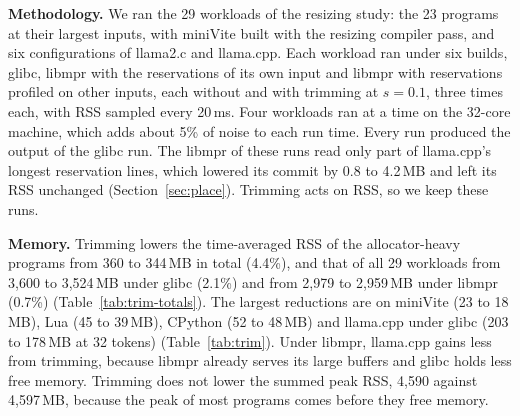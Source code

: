 \documentclass[11pt]{article}
\newcommand{\secref}[1]{Section~\ref{#1}}
\newcommand{\tabref}[1]{Table~\ref{#1}}
\begin{document}
\textbf{Methodology.} We ran the 29 workloads of the resizing study: the 23 programs at their largest inputs, with
miniVite built with the resizing compiler pass, and six configurations of llama2.c and llama.cpp. Each workload ran
under six builds, glibc, libmpr with the reservations of its own input and libmpr with reservations profiled on
other inputs, each without and with trimming at $s = 0.1$, three times each, with RSS sampled every 20\,ms. Four
workloads ran at a time on the 32-core machine, which adds about 5\% of noise to each run time. Every run produced
the output of the glibc run. The libmpr of these runs read only part of llama.cpp's longest reservation lines, which
lowered its commit by 0.8 to 4.2\,MB and left its RSS unchanged (\secref{sec:place}). Trimming acts on RSS, so we
keep these runs.

\begin{table}[t]
\centering
\small
\caption{Memory summed over the workloads under each build, mean of 3 runs: the peak RSS and the time-averaged RSS
(MB), RSS integrated over the run (GB\,s), and the time-averaged reservation of dynamic provisioning, which holds the
request for the first sixth of the run and then each sixth's largest RSS (MB). Trimming at $s = 0.1$, from
\texttt{free}.}
\label{tab:trim-totals}
\setlength{\tabcolsep}{4pt}

\end{table}

\begin{table}[t]
\centering
\small
\caption{The workloads on which trimming happened (more than one trim in a run): time-averaged RSS (MB), run time
over the glibc run's, and the trims per run, mean of 3 runs. On the other 17 workloads, libmpr made at most one
trim per run.}
\label{tab:trim}
\setlength{\tabcolsep}{4pt}

\end{table}

\textbf{Memory.} Trimming lowers the time-averaged RSS of the allocator-heavy programs from 360 to 344\,MB in total
(4.4\%), and that of all 29 workloads from 3{,}600 to 3{,}524\,MB under glibc (2.1\%) and from 2{,}979 to
2{,}959\,MB under libmpr (0.7\%) (\tabref{tab:trim-totals}). The largest reductions are on miniVite (23 to 18\,MB),
Lua (45 to 39\,MB), CPython (52 to 48\,MB) and llama.cpp under glibc (203 to 178\,MB at 32 tokens)
(\tabref{tab:trim}). Under libmpr, llama.cpp gains less from trimming, because libmpr already serves its large
buffers and glibc holds less free memory. Trimming does not lower the summed peak RSS, 4{,}590 against 4{,}597\,MB,
because the peak of most programs comes before they free memory.
\end{document}
